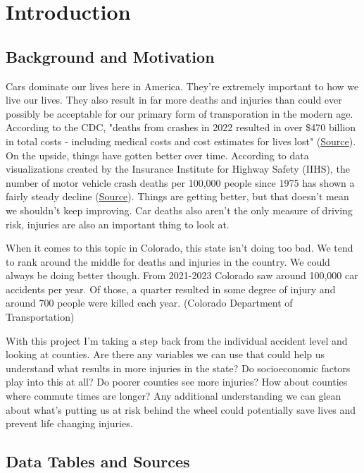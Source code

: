 \section*{Introduction}

\subsection*{Background and Motivation}

Cars dominate our lives here in America. They're extremely important to how we live our lives. They also result in far more deaths and injuries than could ever possibly be acceptable for our primary form of transporation in the modern age. According to the CDC, "deaths from crashes in 2022 resulted in over \$470 billion in total costs - including medical costs and cost estimates for lives lost" (\href{https://www.cdc.gov/transportation-safety/about/index.html}{Source}). On the upside, things have gotten better over time. According to data visualizations created by the Insurance Institute for Highway Safety (IIHS), the number of motor vehicle crash deaths per 100,000 people since 1975 has shown a fairly steady decline (\href{https://www.iihs.org/topics/fatality-statistics/detail/yearly-snapshot}{Source}). Things are getting better, but that doesn't mean we shouldn't keep improving. Car deaths also aren't the only measure of driving risk, injuries are also an important thing to look at. 

When it comes to this topic in Colorado, this state isn't doing too bad. We tend to rank around the middle for deaths and injuries in the country. We could always be doing better though. From 2021-2023 Colorado saw around 100,000 car accidents per year. Of those, a quarter resulted in some degree of injury and around 700 people were killed each year. (Colorado Department of Transportation)

With this project I'm taking a step back from the individual accident level and looking at counties. Are there any variables we can use that could help us understand what results in more injuries in the state? Do socioeconomic factors play into this at all? Do poorer counties see more injuries? How about counties where commute times are longer? Any additional understanding we can glean about what's putting us at risk behind the wheel could potentially save lives and prevent life changing injuries.

\subsection*{Data Tables and Sources}

